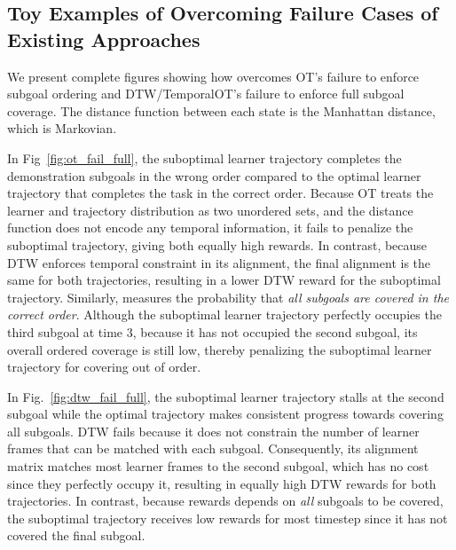\subsection{Toy Examples of \orca{} Overcoming Failure Cases of Existing Approaches\label{app:toy_orca_success}}
We present complete figures showing how \orca{} overcomes OT's failure to enforce subgoal ordering and DTW/TemporalOT's failure to enforce full subgoal coverage. The distance function between each state is the Manhattan distance, which is Markovian.  


In Fig~\ref{fig:ot_fail_full}, the suboptimal learner trajectory completes the demonstration subgoals in the wrong order compared to the optimal learner trajectory that completes the task in the correct order. Because OT treats the learner and trajectory distribution as two unordered sets, and the distance function does not encode any temporal information, it fails to penalize the suboptimal trajectory, giving both equally high rewards. In contrast, because DTW enforces temporal constraint in its alignment, the final alignment is the same for both trajectories, resulting in a lower DTW reward for the suboptimal trajectory. Similarly, \orca{} measures the probability that \emph{all subgoals are covered in the correct order}. Although the suboptimal learner trajectory perfectly occupies the third subgoal at time 3, because it has not occupied the second subgoal, its overall ordered coverage is still low, thereby penalizing the suboptimal learner trajectory for covering out of order.


In Fig.~\ref{fig:dtw_fail_full}, the suboptimal learner trajectory stalls at the second subgoal while the optimal trajectory makes consistent progress towards covering all subgoals. DTW fails because it does not constrain the number of learner frames that can be matched with each subgoal. Consequently, its alignment matrix matches most learner frames to the second subgoal, which has no cost since they perfectly occupy it, resulting in equally high DTW rewards for both trajectories. In contrast, because \orca{} rewards depends on \emph{all} subgoals to be covered, the suboptimal trajectory receives low rewards for most timestep since it has not covered the final subgoal.

